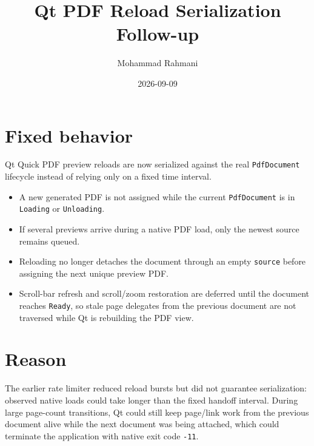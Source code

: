 \documentclass[a4paper]{article}
\title{Qt PDF Reload Serialization Follow-up}
\date{2026-09-09}
\author{Mohammad Rahmani}
\begin{document}
   \maketitle

   \begin{preview}
      \section{Fixed behavior}

      Qt Quick PDF preview reloads are now serialized against the real
      \verb|PdfDocument| lifecycle instead of relying only on a fixed time
      interval.

      \begin{itemize}
         \item A new generated PDF is not assigned while the current
         \verb|PdfDocument| is in \verb|Loading| or \verb|Unloading|.
         \item If several previews arrive during a native PDF load, only the
         newest source remains queued.
         \item Reloading no longer detaches the document through an empty
         \verb|source| before assigning the next unique preview PDF.
         \item Scroll-bar refresh and scroll/zoom restoration are deferred
         until the document reaches \verb|Ready|, so stale page delegates from
         the previous document are not traversed while Qt is rebuilding the
         PDF view.
      \end{itemize}

      \section{Reason}

      The earlier rate limiter reduced reload bursts but did not guarantee
      serialization: observed native loads could take longer than the fixed
      handoff interval. During large page-count transitions, Qt could still
      keep page/link work from the previous document alive while the next
      document was being attached, which could terminate the application with
      native exit code \verb|-11|.
   \end{preview}

   
   
\end{document}
